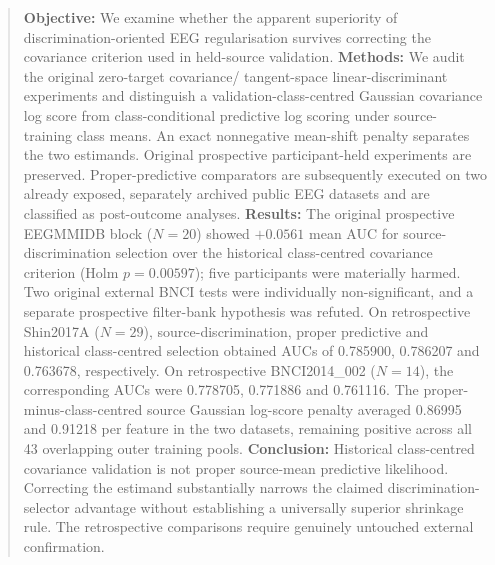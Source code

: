 \begin{abstract}
\textbf{Objective:} We examine whether the apparent superiority of
discrimination-oriented EEG regularisation survives correcting
the covariance criterion used in held-source validation.
\textbf{Methods:} We audit the original zero-target covariance/
tangent-space linear-discriminant experiments and distinguish
a validation-class-centred Gaussian covariance log score
from class-conditional predictive log scoring under source-
training class means. An exact nonnegative mean-shift
penalty separates the two estimands. Original prospective
participant-held experiments are preserved. Proper-predictive
comparators are subsequently executed on two already
exposed, separately archived public EEG datasets and
are classified as post-outcome analyses.
\textbf{Results:} The original prospective EEGMMIDB
block ($N=20$) showed $+0.0561$ mean AUC for
source-discrimination selection over the historical
class-centred covariance criterion (Holm $p=0.00597$);
five participants were materially harmed. Two original
external BNCI tests were individually non-significant,
and a separate prospective filter-bank hypothesis was
refuted. On retrospective Shin2017A ($N=29$),
source-discrimination, proper predictive and historical
class-centred selection obtained AUCs of 0.785900,
0.786207 and 0.763678, respectively.
On retrospective BNCI2014\_002 ($N=14$), the
corresponding AUCs were 0.778705, 0.771886 and
0.761116. The proper-minus-class-centred
source Gaussian log-score penalty averaged 0.86995
and 0.91218 per feature in the two datasets,
remaining positive across all 43 overlapping
outer training pools.
\textbf{Conclusion:} Historical class-centred covariance
validation is not proper source-mean predictive
likelihood. Correcting the estimand substantially
narrows the claimed discrimination-selector
advantage without establishing a universally
superior shrinkage rule. The retrospective comparisons
require genuinely untouched external confirmation.
\end{abstract}
